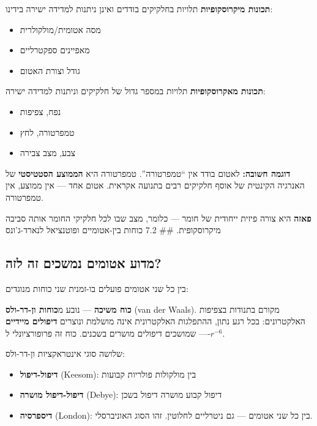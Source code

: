 \documentclass[
  hebrew,
  letterpaper,
  DIV=11,
  numbers=noendperiod]{scrreprt}
\providecommand{\tightlist}{%
  \setlength{\itemsep}{0pt}\setlength{\parskip}{0pt}}
\begin{document}
\textbf{תכונות מיקרוסקופיות} תלויות בחלקיקים בודדים ואינן ניתנות למדידה
ישירה בידינו:

\begin{itemize}
\tightlist
\item
  מסה אטומית/מולקולרית
\item
  מאפיינים ספקטרליים
\item
  גודל וצורת האטום
\end{itemize}

\textbf{תכונות מאקרוסקופיות} תלויות במספר גדול של חלקיקים וניתנות למדידה
ישירה:

\begin{itemize}
\tightlist
\item
  נפח, צפיפות
\item
  טמפרטורה, לחץ
\item
  צבע, מצב צבירה
\end{itemize}

\textbf{דוגמה חשובה:} לאטום בודד אין ``טמפרטורה''. טמפרטורה היא
\textbf{הממוצע הסטטיסטי} של האנרגיה הקינטית של אוסף חלקיקים רבים בתנועה
אקראית. אטום אחד --- אין ממוצע, אין טמפרטורה.

\textbf{פאזה} היא צורה פיזית ייחודית של חומר --- כלומר, מצב שבו לכל
חלקיקי החומר אותה סביבה מיקרוסקופית. \#\# 7.2 כוחות בין-אטומיים
ופוטנציאל לנארד-ג'ונס

\subsection{מדוע אטומים נמשכים זה
לזה?}\label{ux5deux5d3ux5d5ux5e2-ux5d0ux5d8ux5d5ux5deux5d9ux5dd-ux5e0ux5deux5e9ux5dbux5d9ux5dd-ux5d6ux5d4-ux5dcux5d6ux5d4}

בין כל שני אטומים פועלים בו-זמנית שני כוחות מנוגדים:

\textbf{כוח משיכה} --- נובע מ\textbf{כוחות ון-דר-ולס} (van der Waals).
מקורם בתנודות בצפיפות האלקטרונים: בכל רגע נתון, ההתפלגות האלקטרונית אינה
מושלמת ונוצרים \textbf{דיפולים מיידיים} --- שמושכים דיפולים מושרים
בשכנים. כוח זה פרופורציונלי ל-\(r^{-6}\).

שלושה סוגי אינטראקציות ון-דר-ולס:

\begin{itemize}
\tightlist
\item
  \textbf{דיפול-דיפול} (Keesom): בין מולקולות פולריות קבועות
\item
  \textbf{דיפול-דיפול מושרה} (Debye): דיפול קבוע מושרה דיפול בשכן
\item
  \textbf{דיספרסיה} (London): בין כל שני אטומים --- גם ניטרליים לחלוטין.
  זהו הסוג האוניברסלי.
\end{itemize}
\end{document}
